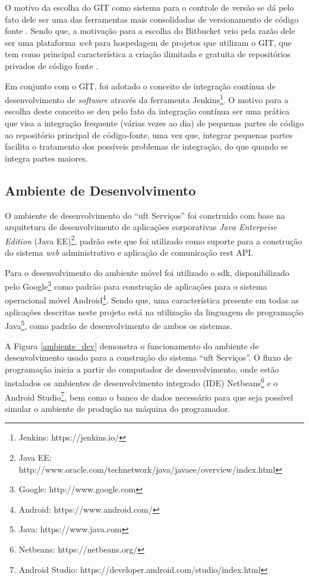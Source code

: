 O motivo da escolha do GIT como sistema para o controle de versão se dá pelo fato dele ser uma das ferramentas mais consolidadas de versionamento de código fonte \cite{gitcontrole}. Sendo que, a motivação para a escolha do Bitbucket veio pela razão dele ser uma plataforma \textit{web} para hospedagem de projetos que utilizam o GIT, que tem como principal característica a criação ilimitada e gratuita de repositórios privados de código fonte \cite{bitbucket}.

Em conjunto com o GIT, foi adotado o conceito de integração contínua de desenvolvimento de \textit{software} através da ferramenta Jenkins\footnote{Jenkins: https://jenkins.io/}. O motivo para a escolha deste conceito se deu pelo fato da integração contínua ser uma prática que visa a integração frequente (várias vezes ao dia) de pequenas partes de código ao repositório principal de código-fonte, uma vez que, integrar pequenas partes facilita o tratamento dos possíveis problemas de integração, do que quando se integra partes maiores.

\subsection*{Ambiente de Desenvolvimento} 

\noindent O ambiente de desenvolvimento do ``\acrshort{uft} Serviços'' foi construído com base na arquitetura de desenvolvimento de aplicações corporativas \textit{Java Enterprise Edition} (Java EE)\footnote{Java EE: http://www.oracle.com/technetwork/java/javaee/overview/index.html}, padrão este que foi utilizado como suporte para a construção do sistema \textit{web} administrativo e aplicação de comunicação \acrshort{rest} API. 

Para o desenvolvimento do ambiente móvel foi utilizado o \gls{sdk}, disponibilizado pelo Google\footnote{Google: http://www.google.com} como padrão para construção de aplicações para o sistema operacional móvel Android\footnote{Android: https://www.android.com/}. Sendo que, uma característica presente em todas as aplicações descritas neste projeto está na utilização da linguagem de programação Java\footnote{Java: https://www.java.com}, como padrão de desenvolvimento de ambos os sistemas. 

A Figura \ref{ambiente_dev} demonstra o funcionamento do ambiente de desenvolvimento usado para a construção do sistema ``\acrshort{uft} Serviços''. O fluxo de programação inicia a partir do computador de desenvolvimento, onde estão instalados os ambientes de desenvolvimento integrado (IDE) Netbeans\footnote{Netbeans: https://netbeans.org/} e o Android Studio\footnote{Android Studio: https://developer.android.com/studio/index.html}, bem como o banco de dados necessário para que seja possível simular o ambiente de produção na máquina do programador. 

